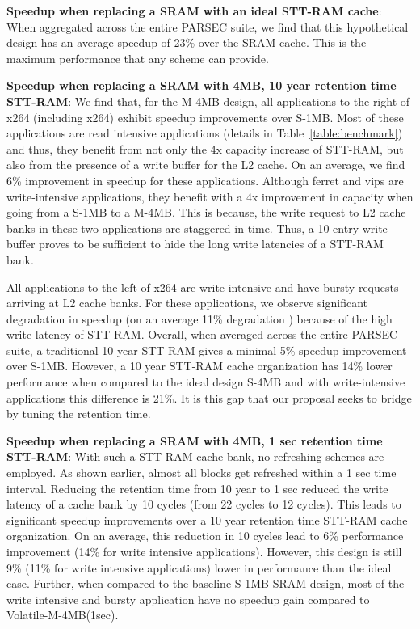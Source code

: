 {\bf Speedup when replacing a SRAM with an ideal STT-RAM cache}: When aggregated across the entire PARSEC suite, we find that this hypothetical design has an average speedup of 23\% over the SRAM cache. This is the maximum performance that any scheme can provide.

{\bf Speedup when replacing a SRAM with 4MB, 10 year retention time STT-RAM}: We find that, for the M-4MB design, all applications to the right of x264 (including x264) exhibit speedup improvements over S-1MB. Most of these applications are read intensive applications (details in Table~\ref{table:benchmark}) and thus, they benefit from not only the 4x capacity increase of STT-RAM, but also from the presence of a write buffer for the L2 cache. On an average, we find 6\% improvement in speedup for these applications. Although ferret and vips are write-intensive applications, they benefit with a 4x improvement in capacity when going from a S-1MB to a M-4MB. This is because, the write request to L2 cache banks in these two applications are staggered in time. Thus, a 10-entry write buffer proves to be sufficient to hide the long write latencies of a STT-RAM bank.

All applications to the left of x264 are write-intensive and have bursty requests arriving at L2 cache banks. For these applications, we observe significant degradation in speedup (on an average 11\% degradation ) because of the high write latency of STT-RAM.
Overall, when averaged across the entire PARSEC suite, a traditional 10 year STT-RAM gives a minimal 5\% speedup improvement over S-1MB. However, a 10 year STT-RAM cache organization has 14\% lower performance when compared to the ideal design S-4MB and with write-intensive applications this difference is 21\%. It is this gap that our proposal seeks to bridge by tuning the retention time.

{\bf Speedup when replacing a SRAM with 4MB, 1 sec retention time STT-RAM}: With such a STT-RAM cache bank, no refreshing schemes are employed. As shown earlier, almost all blocks get refreshed within a 1 sec time interval. Reducing the retention time from 10 year to 1 sec reduced the write latency of a cache bank by 10 cycles (from 22 cycles to 12 cycles). This leads to significant speedup improvements over a 10 year retention time STT-RAM cache organization. On an average, this reduction in 10 cycles lead to 6\% performance improvement (14\% for write intensive applications). However, this design is still 9\% (11\% for write intensive applications) lower in performance than the ideal case.
Further, when compared to the baseline S-1MB SRAM design, most of the write intensive and bursty application have no speedup gain compared to
Volatile-M-4MB(1sec).

